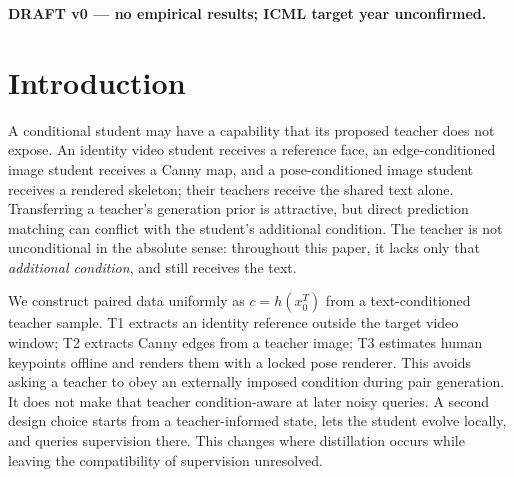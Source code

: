 \documentclass{article}
\begin{document}
\printAffiliationsAndNotice{}
\noindent\textbf{DRAFT v0 --- no empirical results; ICML target year unconfirmed.}

\begin{abstract}
We propose to study diffusion distillation when a frozen teacher lacks an additional condition required by its student. The mandatory research scope comprises three tasks: reference-identity video generation (T1), Canny-edge-conditioned image generation (T2), and human-pose-conditioned image generation (T3). In every task, a condition extracted from a teacher sample creates paired data, but a later teacher prediction at a student-visited state need not preserve that condition. We formulate a local target construction that projects conflicting teacher directions against a differentiable condition-error gradient, limits their magnitude, and checks candidate targets with the actual proxy. We combine it with a teacher step followed by a short student rollout and require matched controls, independent condition evaluation, and separate gates for every task. This draft is a falsifiable protocol with no empirical results; task-specific negative outcomes must remain visible, and no cross-task success or efficiency claim is established.
\end{abstract}

\section{Introduction}
A conditional student may have a capability that its proposed teacher does not expose. An identity video student receives a reference face, an edge-conditioned image student receives a Canny map, and a pose-conditioned image student receives a rendered skeleton; their teachers receive the shared text alone. Transferring a teacher's generation prior is attractive, but direct prediction matching can conflict with the student's additional condition. The teacher is not unconditional in the absolute sense: throughout this paper, it lacks only that \emph{additional condition}, and still receives the text.

We construct paired data uniformly as $c=h(x_0^T)$ from a text-conditioned teacher sample. T1 extracts an identity reference outside the target video window; T2 extracts Canny edges from a teacher image; T3 estimates human keypoints offline and renders them with a locked pose renderer. This avoids asking a teacher to obey an externally imposed condition during pair generation. It does not make that teacher condition-aware at later noisy queries. A second design choice starts from a teacher-informed state, lets the student evolve locally, and queries supervision there. This changes where distillation occurs while leaving the compatibility of supervision unresolved.
\end{document}
